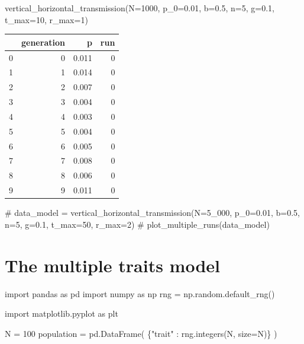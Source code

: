 \documentclass[
  a4paperpaper,
  ,captions=tableheading
]{scrbook}
\newenvironment{Shaded}{\begin{snugshade}}{\end{snugshade}}
\newcommand{\CommentTok}[1]{\textcolor[rgb]{0.37,0.37,0.37}{#1}}
\newcommand{\DecValTok}[1]{\textcolor[rgb]{0.68,0.00,0.00}{#1}}
\newcommand{\FloatTok}[1]{\textcolor[rgb]{0.68,0.00,0.00}{#1}}
\newcommand{\ImportTok}[1]{\textcolor[rgb]{0.00,0.46,0.62}{#1}}
\newcommand{\NormalTok}[1]{\textcolor[rgb]{0.00,0.23,0.31}{#1}}
\newcommand{\OperatorTok}[1]{\textcolor[rgb]{0.37,0.37,0.37}{#1}}
\newcommand{\StringTok}[1]{\textcolor[rgb]{0.13,0.47,0.30}{#1}}
\begin{document}
\begin{Shaded}
\begin{Highlighting}[]
\NormalTok{vertical\_horizontal\_transmission(N}\OperatorTok{=}\DecValTok{1000}\NormalTok{, p\_0}\OperatorTok{=}\FloatTok{0.01}\NormalTok{, b}\OperatorTok{=}\FloatTok{0.5}\NormalTok{, n}\OperatorTok{=}\DecValTok{5}\NormalTok{, g}\OperatorTok{=}\FloatTok{0.1}\NormalTok{, t\_max}\OperatorTok{=}\DecValTok{10}\NormalTok{, r\_max}\OperatorTok{=}\DecValTok{1}\NormalTok{)}
\end{Highlighting}
\end{Shaded}

\begin{tabular}{lrrr}
\toprule
{} &  generation &      p &  run \\
\midrule
0 &           0 &  0.011 &    0 \\
1 &           1 &  0.014 &    0 \\
2 &           2 &  0.007 &    0 \\
3 &           3 &  0.004 &    0 \\
4 &           4 &  0.003 &    0 \\
5 &           5 &  0.004 &    0 \\
6 &           6 &  0.005 &    0 \\
7 &           7 &  0.008 &    0 \\
8 &           8 &  0.006 &    0 \\
9 &           9 &  0.011 &    0 \\
\bottomrule
\end{tabular}

\begin{Shaded}
\begin{Highlighting}[]
\CommentTok{\# data\_model = vertical\_horizontal\_transmission(N=5\_000, p\_0=0.01, b=0.5, n=5, g=0.1, t\_max=50, r\_max=2)}
\CommentTok{\# plot\_multiple\_runs(data\_model)}
\end{Highlighting}
\end{Shaded}

\hypertarget{sec-multiple-traits}{%
\chapter{The multiple traits model}\label{sec-multiple-traits}}

\begin{Shaded}
\begin{Highlighting}[]
\ImportTok{import}\NormalTok{ pandas }\ImportTok{as}\NormalTok{ pd}
\ImportTok{import}\NormalTok{ numpy }\ImportTok{as}\NormalTok{ np}
\NormalTok{rng }\OperatorTok{=}\NormalTok{ np.random.default\_rng()}

\ImportTok{import}\NormalTok{ matplotlib.pyplot }\ImportTok{as}\NormalTok{ plt}

\NormalTok{N }\OperatorTok{=} \DecValTok{100}
\NormalTok{population }\OperatorTok{=}\NormalTok{ pd.DataFrame(}
\NormalTok{    \{}\StringTok{"trait"}\NormalTok{ : rng.integers(N, size}\OperatorTok{=}\NormalTok{N)\}}
\NormalTok{)}
\end{Highlighting}
\end{Shaded}
\end{document}
